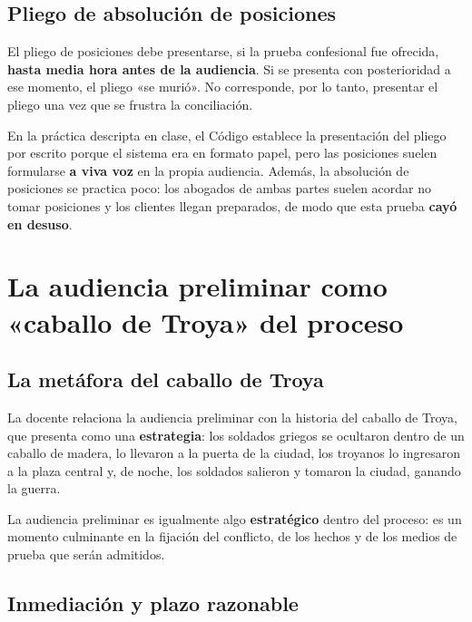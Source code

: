 \documentclass[12pt,oneside]{book}
\begin{document}
\section{Pliego de absolución de posiciones}

El pliego de posiciones debe presentarse, si la prueba confesional fue ofrecida, \textbf{hasta media hora antes de la audiencia}. Si se presenta con posterioridad a ese momento, el pliego «se murió». No corresponde, por lo tanto, presentar el pliego una vez que se frustra la conciliación.

\begin{note}
En la práctica descripta en clase, el Código establece la presentación del pliego por escrito porque el sistema era en formato papel, pero las posiciones suelen formularse \textbf{a viva voz} en la propia audiencia. Además, la absolución de posiciones se practica poco: los abogados de ambas partes suelen acordar no tomar posiciones y los clientes llegan preparados, de modo que esta prueba \textbf{cayó en desuso}.
\end{note}

\chapter[La audiencia preliminar como «caballo de Troya»]{La audiencia preliminar como «caballo de Troya» del proceso}

\section{La metáfora del caballo de Troya}

La docente relaciona la audiencia preliminar con la historia del caballo de Troya, que presenta como una \textbf{estrategia}: los soldados griegos se ocultaron dentro de un caballo de madera, lo llevaron a la puerta de la ciudad, los troyanos lo ingresaron a la plaza central y, de noche, los soldados salieron y tomaron la ciudad, ganando la guerra.

La audiencia preliminar es igualmente algo \textbf{estratégico} dentro del proceso: es un momento culminante en la fijación del conflicto, de los hechos y de los medios de prueba que serán admitidos.

\section{Inmediación y plazo razonable}
\end{document}
